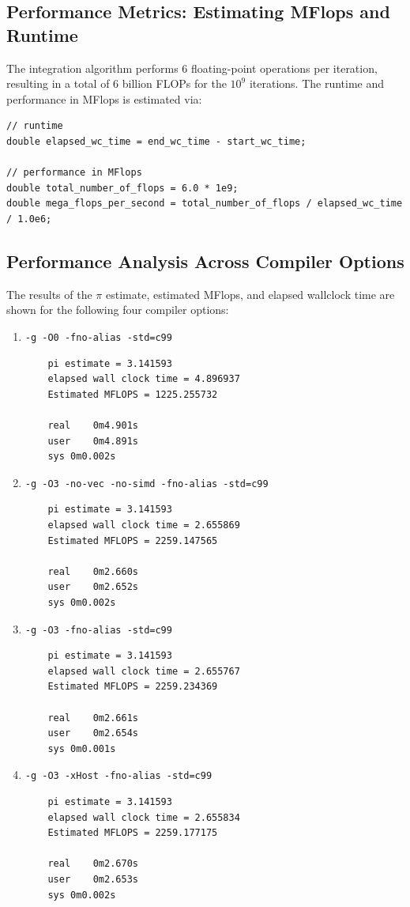 \documentclass{article}
\begin{document}
\subsection*{Performance Metrics: Estimating MFlops and Runtime}
The integration algorithm performs 6 floating-point operations per iteration, resulting in a total of 6 billion FLOPs for the $10^9$ iterations. 
The runtime and performance in MFlops is estimated via:

\begin{lstlisting}
// runtime
double elapsed_wc_time = end_wc_time - start_wc_time;

// performance in MFlops
double total_number_of_flops = 6.0 * 1e9;
double mega_flops_per_second = total_number_of_flops / elapsed_wc_time / 1.0e6;
\end{lstlisting}
\subsection*{Performance Analysis Across Compiler Options}
The results of the $\pi$ estimate, estimated MFlops, and elapsed wallclock time are shown for the following four compiler options:
\begin{enumerate}
    \item \texttt{-g -O0 -fno-alias -std=c99}
    \begin{lstlisting}
    pi estimate = 3.141593
    elapsed wall clock time = 4.896937
    Estimated MFLOPS = 1225.255732

    real	0m4.901s
    user	0m4.891s
    sys	0m0.002s
    \end{lstlisting}
    \item \texttt{-g -O3 -no-vec -no-simd -fno-alias -std=c99}
    \begin{lstlisting}
    pi estimate = 3.141593
    elapsed wall clock time = 2.655869
    Estimated MFLOPS = 2259.147565
    
    real	0m2.660s
    user	0m2.652s
    sys	0m0.002s
    \end{lstlisting}
    \newpage
    \item \texttt{-g -O3 -fno-alias -std=c99}
    \begin{lstlisting}
    pi estimate = 3.141593
    elapsed wall clock time = 2.655767
    Estimated MFLOPS = 2259.234369
    
    real	0m2.661s
    user	0m2.654s
    sys	0m0.001s
    \end{lstlisting}
    \item \texttt{-g -O3 -xHost -fno-alias -std=c99}
    \begin{lstlisting}
    pi estimate = 3.141593
    elapsed wall clock time = 2.655834
    Estimated MFLOPS = 2259.177175
    
    real	0m2.670s
    user	0m2.653s
    sys	0m0.002s
    \end{lstlisting}
\end{enumerate}
\end{document}

